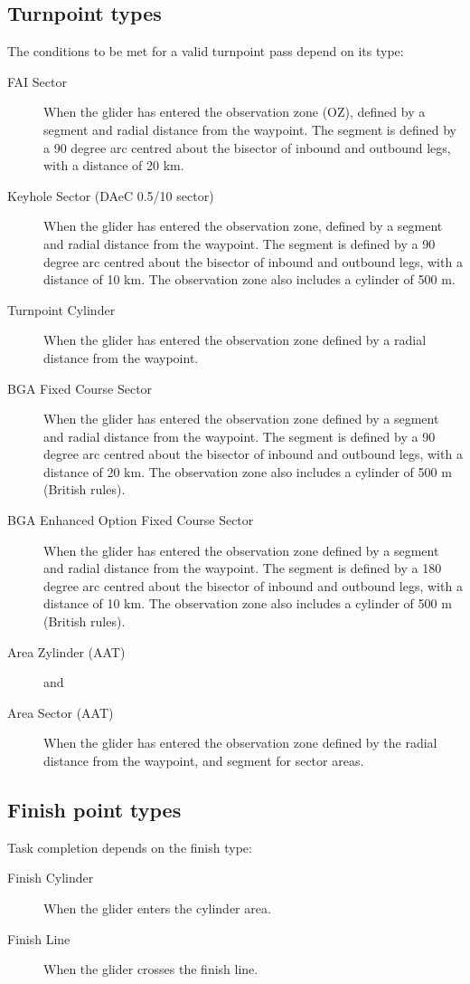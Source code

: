 \subsection*{Turnpoint types}
The conditions to be met for a valid turnpoint pass depend on its
 type:
\begin{description}
\item[FAI Sector] When the glider has entered the observation zone (OZ), defined 
by a segment and radial distance from the waypoint.  The segment is
defined by a 90 degree arc centred about the bisector of inbound and
outbound legs, with a distance of 20 km.
\item[Keyhole Sector (DAeC 0.5/10 sector)] When the glider has entered the
observation zone, defined by a segment and radial distance from the waypoint.  The segment is
defined by a 90 degree arc centred about the bisector of inbound and
outbound legs, with a distance of 10 km.  The observation zone also includes
a cylinder of 500 m.
\item[Turnpoint Cylinder]  When the glider has entered the observation zone
defined by a radial distance from the waypoint.
\item[BGA Fixed Course Sector]  When the glider has entered the
observation zone defined by a segment and radial distance from the
waypoint. The segment is defined by a 90 degree arc centred about the
bisector of inbound and outbound legs, with a distance of 20 km.
The observation zone also includes a cylinder of 500 m (British rules).
\item[BGA Enhanced Option Fixed Course Sector]  When the glider has entered the
observation zone defined by a segment and radial distance from the
waypoint. The segment is defined by a 180 degree arc centred about the
bisector of inbound and outbound legs, with a distance of 10 km.
The observation zone also includes a cylinder of 500 m (British rules).
\item[Area Zylinder (AAT)]  and
\item[Area Sector (AAT)]  When the glider has entered the observation zone
defined by the radial distance from the waypoint, and segment for sector areas.
\end{description}

\subsection*{Finish point types}
Task completion depends on the finish type:
\begin{description}
\item[Finish Cylinder] When the glider enters the cylinder area.
\item[Finish Line] When the glider crosses the finish line.
\end{description}

